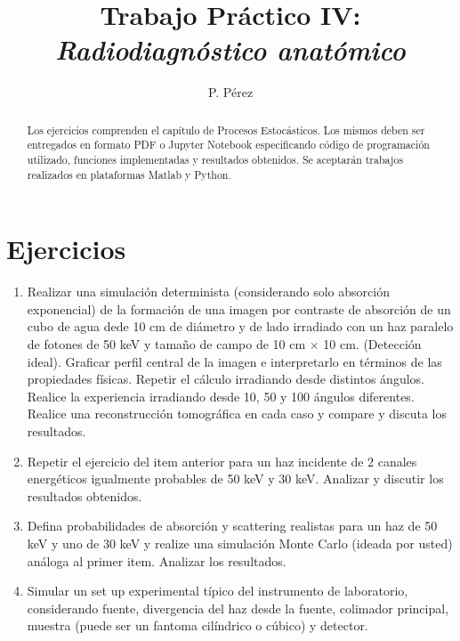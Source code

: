 \documentclass[a4paper,10pt]{article}
\title{{\bf Trabajo Práctico IV:}\\ \emph{Radiodiagnóstico anatómico}}
\author{P. Pérez}
\begin{document}
\maketitle

\begin{abstract}
Los ejercicios comprenden el capítulo de Procesos Estocásticos. Los mismos deben ser entregados en formato PDF o Jupyter Notebook especificando código de programación utilizado, funciones implementadas y resultados obtenidos. Se aceptarán trabajos realizados en plataformas Matlab y Python.
\end{abstract}

\section*{Ejercicios}

\begin{enumerate}
 \item  Realizar una simulación determinista (considerando solo absorción exponencial) de la formación de una imagen por contraste de absorción de un cubo de agua dede 10 cm de diámetro y de lado irradiado con un haz paralelo de fotones de 50 keV y tamaño de campo de 10 cm $\times$ 10 cm. (Detección ideal). Graficar perfil central de la imagen e interpretarlo en términos de las propiedades físicas. Repetir el cálculo irradiando desde distintos ángulos. Realice la experiencia irradiando desde 10, 50 y 100 ángulos diferentes. Realice una reconstrucción tomográfica en cada caso y compare y discuta los resultados.
 \item Repetir el ejercicio del item anterior para un haz incidente de 2 canales energéticos igualmente probables de 50 keV y 30 keV. Analizar y discutir los resultados obtenidos.
 \item Defina probabilidades de absorción y scattering realistas para un haz de 50 keV y uno de 30 keV y realize una simulación Monte Carlo (ideada por usted) análoga al primer item. Analizar los resultados.
 \item Simular un set up experimental típico del instrumento de laboratorio, considerando fuente, divergencia del haz desde la fuente, colimador principal, muestra (puede ser un fantoma cilíndrico o cúbico) y detector.
 \end{enumerate}
\end{document}
